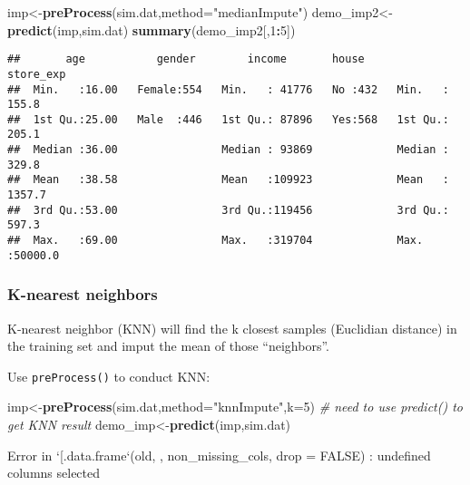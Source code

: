 \documentclass[
]{article}
\newenvironment{Shaded}{\begin{snugshade}}{\end{snugshade}}
\newcommand{\CommentTok}[1]{\textcolor[rgb]{0.56,0.35,0.01}{\textit{#1}}}
\newcommand{\DataTypeTok}[1]{\textcolor[rgb]{0.13,0.29,0.53}{#1}}
\newcommand{\DecValTok}[1]{\textcolor[rgb]{0.00,0.00,0.81}{#1}}
\newcommand{\KeywordTok}[1]{\textcolor[rgb]{0.13,0.29,0.53}{\textbf{#1}}}
\newcommand{\NormalTok}[1]{#1}
\newcommand{\OperatorTok}[1]{\textcolor[rgb]{0.81,0.36,0.00}{\textbf{#1}}}
\newcommand{\StringTok}[1]{\textcolor[rgb]{0.31,0.60,0.02}{#1}}
\begin{document}
\begin{Shaded}
\begin{Highlighting}[]
\NormalTok{imp<-}\KeywordTok{preProcess}\NormalTok{(sim.dat,}\DataTypeTok{method=}\StringTok{"medianImpute"}\NormalTok{)}
\NormalTok{demo_imp2<-}\KeywordTok{predict}\NormalTok{(imp,sim.dat)}
\KeywordTok{summary}\NormalTok{(demo_imp2[,}\DecValTok{1}\OperatorTok{:}\DecValTok{5}\NormalTok{])}
\end{Highlighting}
\end{Shaded}

\begin{verbatim}
##       age           gender        income       house       store_exp      
##  Min.   :16.00   Female:554   Min.   : 41776   No :432   Min.   :  155.8  
##  1st Qu.:25.00   Male  :446   1st Qu.: 87896   Yes:568   1st Qu.:  205.1  
##  Median :36.00                Median : 93869             Median :  329.8  
##  Mean   :38.58                Mean   :109923             Mean   : 1357.7  
##  3rd Qu.:53.00                3rd Qu.:119456             3rd Qu.:  597.3  
##  Max.   :69.00                Max.   :319704             Max.   :50000.0
\end{verbatim}

\hypertarget{k-nearest-neighbors}{%
\subsubsection{K-nearest neighbors}\label{k-nearest-neighbors}}

K-nearest neighbor (KNN) will find the k closest samples (Euclidian
distance) in the training set and imput the mean of those ``neighbors''.

Use \texttt{preProcess()} to conduct KNN:

\begin{Shaded}
\begin{Highlighting}[]
\NormalTok{imp<-}\KeywordTok{preProcess}\NormalTok{(sim.dat,}\DataTypeTok{method=}\StringTok{"knnImpute"}\NormalTok{,}\DataTypeTok{k=}\DecValTok{5}\NormalTok{)}
\CommentTok{# need to use predict() to get KNN result}
\NormalTok{demo_imp<-}\KeywordTok{predict}\NormalTok{(imp,sim.dat)}
\end{Highlighting}
\end{Shaded}

\begin{Shaded}
\begin{Highlighting}[]
\NormalTok{Error in `[.data.frame`(old, , non_missing_cols, drop = FALSE) : }
\NormalTok{  undefined columns selected}
\end{Highlighting}
\end{Shaded}
\end{document}

